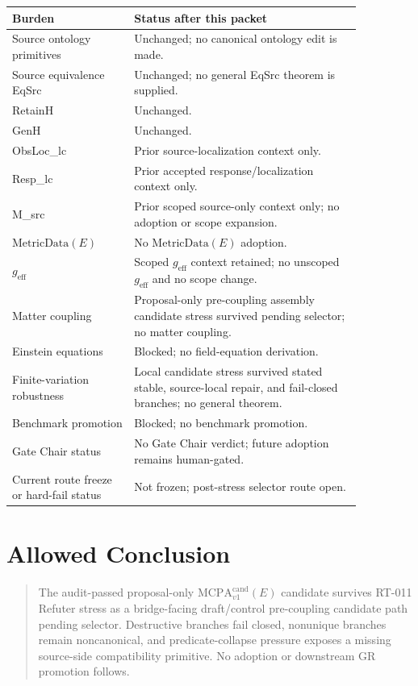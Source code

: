 \documentclass[11pt]{article}
\newcommand{\MetricData}{\mathrm{MetricData}}
\newcommand{\geff}{g_{\mathrm{eff}}}
\newcommand{\MCPACand}{\mathrm{MCPA}^{\mathrm{cand}}_{v1}}
\begin{document}
\begin{longtable}{p{0.30\linewidth}p{0.56\linewidth}}
\toprule
Burden & Status after this packet \\
\midrule
Source ontology primitives & Unchanged; no canonical ontology edit is made. \\
Source equivalence EqSrc & Unchanged; no general EqSrc theorem is supplied. \\
RetainH & Unchanged. \\
GenH & Unchanged. \\
ObsLoc\_lc & Prior source-localization context only. \\
Resp\_lc & Prior accepted response/localization context only. \\
M\_src & Prior scoped source-only context only; no adoption or scope expansion. \\
\(\MetricData(E)\) & No \(\MetricData(E)\) adoption. \\
\(\geff\) & Scoped \(\geff\) context retained; no unscoped \(\geff\) and no scope change. \\
Matter coupling & Proposal-only pre-coupling assembly candidate stress survived pending selector; no matter coupling. \\
Einstein equations & Blocked; no field-equation derivation. \\
Finite-variation robustness & Local candidate stress survived stated stable, source-local repair, and fail-closed branches; no general theorem. \\
Benchmark promotion & Blocked; no benchmark promotion. \\
Gate Chair status & No Gate Chair verdict; future adoption remains human-gated. \\
Current route freeze or hard-fail status & Not frozen; post-stress selector route open. \\
\bottomrule
\end{longtable}

\section{Allowed Conclusion}

\begin{quote}
The audit-passed proposal-only \(\MCPACand(E)\) candidate survives RT-011
Refuter stress as a bridge-facing draft/control pre-coupling candidate path
pending selector. Destructive branches fail closed, nonunique branches remain
noncanonical, and predicate-collapse pressure exposes a missing source-side
compatibility primitive. No adoption or downstream GR promotion follows.
\end{quote}
\end{document}
